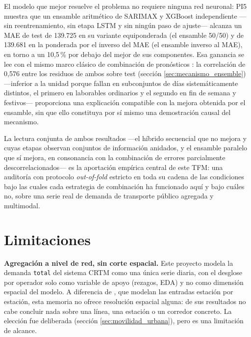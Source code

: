 El modelo que mejor resuelve el problema no requiere ninguna red neuronal: PI5 muestra
que un ensamble aritmético de SARIMAX y XGBoost independiente —sin reentrenamiento, sin
etapa LSTM y sin ningún paso de ajuste— alcanza un MAE de test de 139.725 en su variante
equiponderada (el ensamble 50/50) y de 139.681 en la ponderada por el inverso del MAE (el
ensamble inverso al MAE), en torno a un 10,5\,\% por debajo del mejor de sus componentes.
Esa ganancia se lee con el mismo marco clásico de combinación de pronósticos
\parencite{bates1969combination}: la correlación de 0,576 entre los residuos
de ambos sobre test (sección \ref{sec:mecanismo_ensemble}) —inferior a la unidad porque
fallan en subconjuntos de días sistemáticamente distintos, el primero en laborables
ordinarios y el segundo en fin de semana y festivos— proporciona una explicación
compatible con la mejora obtenida por el ensamble, sin que ello constituya por sí mismo
una demostración causal del mecanismo.

La lectura conjunta de ambos resultados —el híbrido secuencial que no mejora y cuyas
etapas observan conjuntos de información anidados, y el ensamble paralelo que sí mejora,
en consonancia con la combinación de errores parcialmente descorrelacionados— es la
aportación empírica central de este TFM: una auditoría con protocolo \emph{out-of-fold}
estricto en toda su cadena de las condiciones bajo las cuales cada estrategia de
combinación ha funcionado aquí y bajo cuáles no, sobre una serie real de demanda de
transporte público agregada y multimodal.

\section{Limitaciones}\label{sec:limitaciones}

\textbf{Agregación a nivel de red, sin corte espacial.} Este proyecto modela la demanda
\texttt{total} del sistema CRTM como una única serie diaria, con el desglose por operador
solo como variable de apoyo (rezagos, EDA) y no como dimensión espacial del modelo. A
diferencia de \textcite{cardozo2012spatial}, que modelan las entradas estación por
estación, esta memoria no ofrece resolución espacial alguna: de sus resultados no cabe
concluir nada sobre una línea, una estación o un corredor concreto. La elección fue
deliberada (sección \ref{sec:movilidad_urbana}), pero es una limitación de alcance.

